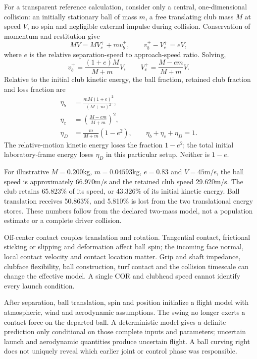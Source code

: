 For a transparent reference calculation, consider only a central, one-dimensional collision: an initially stationary ball of mass $m$, a free translating club mass $M$ at speed $V$, no spin and negligible external impulse during collision. Conservation of momentum and restitution give
\begin{equation}
MV=MV_c^++mv_b^+,\qquad v_b^+-V_c^+=eV,
\label{eq:complete_collision}
\end{equation}
where $e$ is the relative separation-speed to approach-speed ratio. Solving,
\begin{equation}
v_b^+=\frac{(1+e)M}{M+m}V,\qquad
V_c^+=\frac{M-em}{M+m}V.
\label{eq:complete_collision_speeds}
\end{equation}
Relative to the initial club kinetic energy, the ball fraction, retained club fraction and loss fraction are
\begin{equation}
\begin{aligned}
\eta_b&=\frac{mM(1+e)^2}{(M+m)^2},\\
\eta_c&=\left(\frac{M-em}{M+m}\right)^2,\\
\eta_D&=\frac{m}{M+m}(1-e^2),\qquad
\eta_b+\eta_c+\eta_D=1.
\end{aligned}
\label{eq:complete_collision_energy}
\end{equation}
The relative-motion kinetic energy loses the fraction $1-e^2$; the total initial laboratory-frame energy loses $\eta_D$ in this particular setup. Neither is $1-e$.

For illustrative $M=0.200$kg, $m=0.04593$kg, $e=0.83$ and $V=45$m/s, the ball speed is approximately 66.970m/s and the retained club speed 29.620m/s. The club retains 65.823\% of its speed, or 43.326\% of its initial kinetic energy. Ball translation receives 50.863\%, and 5.810\% is lost from the two translational energy stores. These numbers follow from the declared two-mass model, not a population estimate or a complete driver collision.

Off-center contact couples translation and rotation. Tangential contact, frictional sticking or slipping and deformation affect ball spin; the incoming face normal, local contact velocity and contact location matter. Grip and shaft impedance, clubface flexibility, ball construction, turf contact and the collision timescale can change the effective model. A single COR and clubhead speed cannot identify every launch condition.

After separation, ball translation, spin and position initialize a flight model with atmospheric, wind and aerodynamic assumptions. The swing no longer exerts a contact force on the departed ball. A deterministic model gives a definite prediction only conditional on those complete inputs and parameters; uncertain launch and aerodynamic quantities produce uncertain flight. A ball curving right does not uniquely reveal which earlier joint or control phase was responsible.

